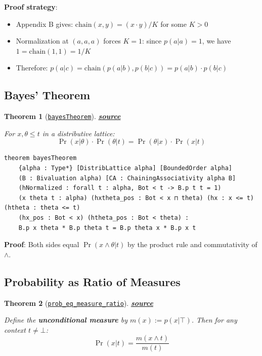 \documentclass[11pt]{article}
\newtheorem{theorem}{Theorem}[section]
\theoremstyle{definition}
\theoremstyle{remark}
\begin{document}
\textbf{Proof strategy}:
\begin{itemize}
\item Appendix B gives: $\text{chain}(x,y) = (x \cdot y)/K$ for some $K > 0$
\item Normalization at $(a,a,a)$ forces $K = 1$: since $p(a|a) = 1$, we have $1 = \text{chain}(1, 1) = 1/K$
\item Therefore: $p(a|c) = \text{chain}(p(a|b), p(b|c)) = p(a|b) \cdot p(b|c)$
\end{itemize}

\subsection{Bayes' Theorem}

\begin{theorem}[\href{https://github.com/zariuq/ks-foundations-of-inference/blob/main/KnuthSkilling/Probability/ConditionalProbability/Basic.lean}{\texttt{bayesTheorem}}]
\textbf{\href{https://github.com/zariuq/ks-foundations-of-inference/blob/main/KnuthSkilling/Probability/ConditionalProbability/Basic.lean}{source}}

For $x, \theta \leq t$ in a distributive lattice:
\[ \Pr(x|\theta) \cdot \Pr(\theta|t) = \Pr(\theta|x) \cdot \Pr(x|t) \]
\end{theorem}

\begin{lstlisting}[caption={\texttt{bayesTheorem} (\href{https://github.com/zariuq/ks-foundations-of-inference/blob/main/KnuthSkilling/Probability/ConditionalProbability/Basic.lean}{Basic.lean})},numbers=none]
theorem bayesTheorem
    {alpha : Type*} [DistribLattice alpha] [BoundedOrder alpha]
    (B : Bivaluation alpha) [CA : ChainingAssociativity alpha B]
    (hNormalized : forall t : alpha, Bot < t -> B.p t t = 1)
    (x theta t : alpha) (hxtheta_pos : Bot < x ⊓ theta) (hx : x <= t) (htheta : theta <= t)
    (hx_pos : Bot < x) (htheta_pos : Bot < theta) :
    B.p x theta * B.p theta t = B.p theta x * B.p x t
\end{lstlisting}

\textbf{Proof}: Both sides equal $\Pr(x \wedge \theta | t)$ by the product rule and commutativity of $\wedge$.

\subsection{Probability as Ratio of Measures}

\begin{theorem}[\href{https://github.com/zariuq/ks-foundations-of-inference/blob/main/KnuthSkilling/Probability/ConditionalProbability/Basic.lean}{\texttt{prob\_eq\_measure\_ratio}}]
\textbf{\href{https://github.com/zariuq/ks-foundations-of-inference/blob/main/KnuthSkilling/Probability/ConditionalProbability/Basic.lean}{source}}

Define the \textbf{unconditional measure} by $m(x) := p(x|\top)$. Then for any context $t \neq \bot$:
\[ \Pr(x|t) = \frac{m(x \wedge t)}{m(t)} \]
\end{theorem}
\end{document}
